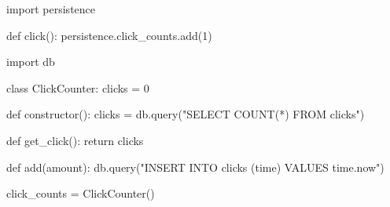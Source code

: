 \documentclass{slide}
\begin{document}
\begin{frame}[fragile]
\begin{code}[style=python,title=business.code,captionpos=t]
import persistence

def click():
    persistence.click_counts.add(1)
\end{code}
\end{frame}

\begin{frame}[fragile]
\small
\begin{code}[style=python,title=persistence.code,captionpos=t]
import db

class ClickCounter:
    clicks = 0

    def constructor():
        clicks = db.query("SELECT COUNT(*) FROM clicks")

    def get_click():
        return clicks

    def add(amount):
        db.query("INSERT INTO clicks (time) VALUES {{time.now}}")

click_counts = ClickCounter()
\end{code}
\end{frame}



\end{document}
